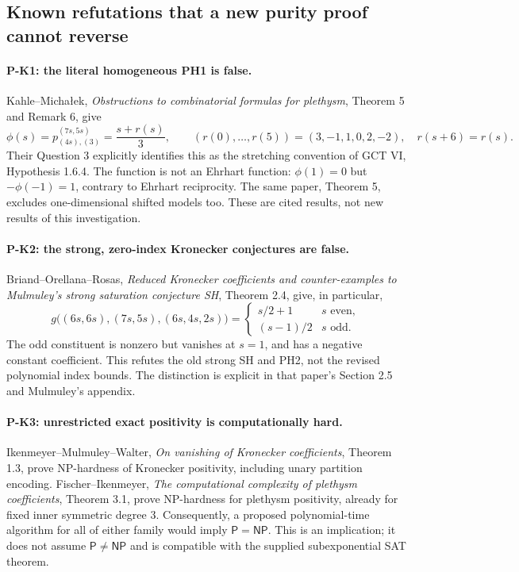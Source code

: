 \documentclass[11pt,a4paper]{article}
\begin{document}
\subsection{Known refutations that a new purity proof cannot reverse}
\paragraph{P-K1: the literal homogeneous PH1 is false.}
Kahle--Micha\l ek, \emph{Obstructions to combinatorial formulas for
plethysm}, Theorem 5 and Remark 6, give
\[
 \phi(s)=p_{(4s),(3)}^{(7s,5s)}
 =\frac{s+r(s)}3,\qquad
 (r(0),\ldots,r(5))=(3,-1,1,0,2,-2),
 \quad r(s+6)=r(s).
 \tag{P-K1}\label{eq:km}
\]
Their Question 3 explicitly identifies this as the stretching convention
of GCT VI, Hypothesis 1.6.4. The function is not an Ehrhart function:
$\phi(1)=0$ but $-\phi(-1)=1$, contrary to Ehrhart reciprocity.
The same paper, Theorem 5, excludes one-dimensional shifted models too.
These are cited results, not new results of this investigation.

\paragraph{P-K2: the strong, zero-index Kronecker conjectures are false.}
Briand--Orellana--Rosas, \emph{Reduced Kronecker coefficients and
counter-examples to Mulmuley's strong saturation conjecture SH},
Theorem 2.4, give, in particular,
\[
 g\bigl((6s,6s),(7s,5s),(6s,4s,2s)\bigr)
 =
 \begin{cases}s/2+1&s\text{ even},\\(s-1)/2&s\text{ odd}.\end{cases}
 \tag{P-K2}
\]
The odd constituent is nonzero but vanishes at $s=1$, and has a negative
constant coefficient. This refutes the old strong SH and PH2, not the
revised polynomial index bounds. The distinction is explicit in that
paper's Section 2.5 and Mulmuley's appendix.

\paragraph{P-K3: unrestricted exact positivity is computationally hard.}
Ikenmeyer--Mulmuley--Walter, \emph{On vanishing of Kronecker coefficients},
Theorem 1.3, prove NP-hardness of Kronecker positivity, including unary
partition encoding. Fischer--Ikenmeyer, \emph{The computational complexity
of plethysm coefficients}, Theorem 3.1, prove NP-hardness for plethysm
positivity, already for fixed inner symmetric degree $3$.
Consequently, a proposed polynomial-time algorithm for all of either
family would imply $\mathsf P=\mathsf{NP}$. This is an implication;
it does not assume $\mathsf P\ne\mathsf{NP}$ and is compatible with the
supplied subexponential SAT theorem.
\end{document}
